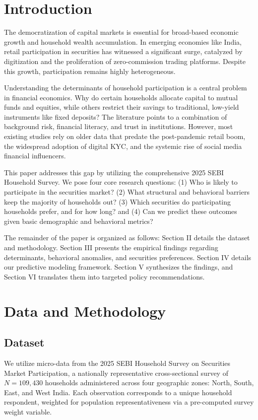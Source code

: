 \documentclass[conference]{IEEEtran}
\begin{document}
\section{Introduction}
The democratization of capital markets is essential for broad-based economic growth and household wealth accumulation. In emerging economies like India, retail participation in securities has witnessed a significant surge, catalyzed by digitization and the proliferation of zero-commission trading platforms. Despite this growth, participation remains highly heterogeneous.

Understanding the determinants of household participation is a central problem in financial economics. Why do certain households allocate capital to mutual funds and equities, while others restrict their savings to traditional, low-yield instruments like fixed deposits? The literature points to a combination of background risk, financial literacy, and trust in institutions. However, most existing studies rely on older data that predate the post-pandemic retail boom, the widespread adoption of digital KYC, and the systemic rise of social media financial influencers.

This paper addresses this gap by utilizing the comprehensive 2025 SEBI Household Survey. We pose four core research questions: (1) Who is likely to participate in the securities market? (2) What structural and behavioral barriers keep the majority of households out? (3) Which securities do participating households prefer, and for how long? and (4) Can we predict these outcomes given basic demographic and behavioral metrics?

The remainder of the paper is organized as follows: Section II details the dataset and methodology. Section III presents the empirical findings regarding determinants, behavioral anomalies, and securities preferences. Section IV details our predictive modeling framework. Section V synthesizes the findings, and Section VI translates them into targeted policy recommendations.

\section{Data and Methodology}

\subsection{Dataset}
We utilize micro-data from the 2025 SEBI Household Survey on Securities Market Participation, a nationally representative cross-sectional survey of $N = 109{,}430$ households administered across four geographic zones: North, South, East, and West India. Each observation corresponds to a unique household respondent, weighted for population representativeness via a pre-computed survey weight variable.
\end{document}
